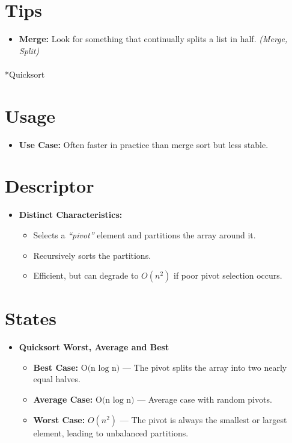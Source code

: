 \documentclass[
  letterpaper,
  DIV=11,
  numbers=noendperiod]{scrreprt}
\makeatletter
\let\oldparagraph\paragraph
\renewcommand{\paragraph}{
    \@ifstar
      \xxxParagraphStar
      \xxxParagraphNoStar
  }
\newcommand{\xxxParagraphStar}[1]{\oldparagraph*{#1}\mbox{}}
\newcommand{\xxxParagraphNoStar}[1]{\oldparagraph{#1}\mbox{}}
\providecommand{\tightlist}{%
  \setlength{\itemsep}{0pt}\setlength{\parskip}{0pt}}
\makeatother
\begin{document}
\section{Tips}

\begin{itemize}
\tightlist
\item
  \textbf{Merge:} Look for something that continually splits a list in
  half. \emph{(Merge, Split)}
\end{itemize}

\paragraph*{Quicksort}\label{quicksort}

\section{Usage}

\begin{itemize}
\tightlist
\item
  \textbf{Use Case:} Often faster in practice than merge sort but less
  stable.
\end{itemize}

\section{Descriptor}

\begin{itemize}
\item
  \textbf{Distinct Characteristics:}

  \begin{itemize}
  \tightlist
  \item
    Selects a \emph{``pivot''} element and partitions the array around
    it.
  \item
    Recursively sorts the partitions.
  \item
    Efficient, but can degrade to \(O(n^2)\) if poor pivot selection
    occurs.
  \end{itemize}
\end{itemize}

\section{States}

\begin{itemize}
\item
  \textbf{Quicksort Worst, Average and Best}

  \begin{itemize}
  \tightlist
  \item
    \textbf{Best Case:} \(\text{O(n ⁡log⁡ n)}\) --- The pivot splits the
    array into two nearly equal halves.
  \item
    \textbf{Average Case:} \(\text{O(n ⁡log⁡ n)}\) --- Average case with
    random pivots.
  \item
    \textbf{Worst Case:} \(O(n^2)\) --- The pivot is always the smallest
    or largest element, leading to unbalanced partitions.
  \end{itemize}
\end{itemize}
\end{document}

